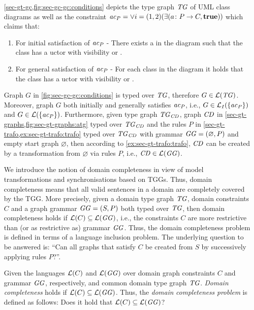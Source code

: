 \begin{example}
\cref{sec-gt-gc,fig:sec-gc-gc:conditions} depicts the type graph $\mathit{TG}$ of UML class diagrams as well as the constraint $\mathit{ac}_P=\vee{i=(1,2)}(\exists(a\colon P \to C,\textbf{true}))$ which claims that:
\begin{enumerate}
  \item For initial satisfaction of $\mathit{ac}_P$ - There exists a  in the diagram such that the class has a uctor with visibility  or .
  \item For general satisfaction of $\mathit{ac}_P$ - For each class in the diagram it holds that the class has a uctor with visibility  or .
\end{enumerate}
Graph $G$ in \cref{fig:sec-gc-gc:conditions} is typed over $\mathit{TG}$, therefore $G \in \mathcal{L}(\mathit{TG})$.
Moreover, graph $G$ both initially and generally satisfies $\mathit{ac}_P$, i.e., $G \in \mathcal{L}_I(\{\mathit{ac}_P\})$ and $G \in \mathcal{L}(\{\mathit{ac}_P\})$.
Furthermore, given type graph $\mathit{TG}_\mathit{CD}$, graph $\mathit{CD}$ in \cref{sec-gt-graphs,fig:sec-gt-graphs:atg} typed over $\mathit{TG}_\mathit{CD}$ and the rules $P$ in \cref{sec-gt-trafo,ex:sec-gt-trafo:trafo} typed over $\mathit{TG}_\mathit{CD}$ with grammar $\mathit{GG}=(\varnothing,P)$ and empty start graph $\varnothing$, then according to \cref{ex:sec-gt-trafo:trafo}, $\mathit{CD}$ can be created by a transformation from $\varnothing$ via rules $P$, i.e., $\mathit{CD} \in \mathcal{L}(\mathit{GG})$.
\envEndMarker
\end{example}

We introduce the notion of domain completeness in view of model transformations and synchronisations based on TGGs.
Thus, domain completeness means that all valid sentences in a domain are completely covered by the TGG.
More precisely, given a domain type graph $\mathit{TG}$, domain constraints $C$ and a graph grammar $\mathit{GG}=(S,P)$ both typed over $\mathit{TG}$, then domain completeness holds if $\mathcal{L}(C) \subseteq \mathcal{L}(\mathit{GG})$, i.e., the constraints $C$ are more restrictive than (or as restrictive as) grammar $\mathit{GG}$.
Thus, the domain completeness problem is defined in terms of a language inclusion problem.
The underlying question to be answered is: ``Can all graphs that satisfy $C$ be created from $S$ by successively applying rules $P$?''.

\begin{definition}
\label{def:sec-dc-general:dcp}
Given the languages $\mathcal{L}(C)$ and $\mathcal{L}(\mathit{GG})$ over domain graph constraints $C$ and grammar $\mathit{GG}$, respectively, and common domain type graph $\mathit{TG}$.
\emph{Domain completeness} holds if $\mathcal{L}(C) \subseteq \mathcal{L}(\mathit{GG})$.
Thus, the \emph{domain completeness problem} is defined as follows: Does it hold that $\mathcal{L}(C) \subseteq \mathcal{L}(\mathit{GG})$?
\envEndMarker
\end{definition}

